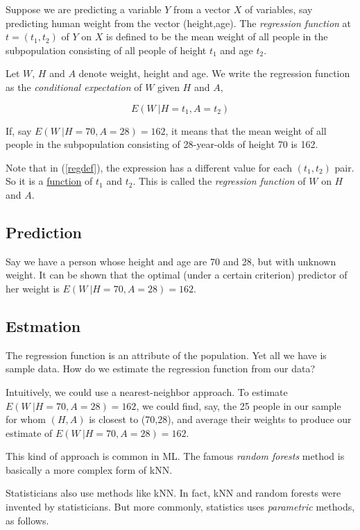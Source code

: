 Suppose we are predicting a variable $Y$ from a vector $X$ of variables,
say predicting human weight from the vector (height,age).  The
\textit{regression function} at $t = (t_1,t_2)$ of $Y$ on $X$ is defined
to be the mean weight of all people in the subpopulation consisting of
all people of height $t_1$ and age $t_2$.

Let $W$, $H$ and $A$ denote weight, height and age.  We write the
regression function as the \textit{conditional expectation} of $W$ given
$H$ and $A$, 

\begin{equation}
\label{regdef}
E(W ~| H=t_1, A=t_2)
\end{equation}

If, say $E(W ~| H=70, A=28) = 162$, it means that the mean weight of all
people in the subpopulation consisting of 28-year-olds of height 70 is
162.

Note that in (\ref{regdef}), the expression has a different value for
each $(t_1,t_2)$ pair.  So it is a \underline{function} of $t_1$ and
$t_2$.  This is called the \textit{regression function} of $W$ on $H$
and $A$.

\subsection{Prediction}

Say we have a person whose height and age are 70 and 28, but with
unknown weight.  It can be shown that the optimal (under a certain
criterion) predictor of her weight is $E(W ~| H=70, A=28) = 162$.

\subsection{Estmation}

The regression function is an attribute of the population.  Yet all we
have is sample data.  How do we estimate the regression function from
our data?

Intuitively, we could use a nearest-neighbor approach.  To estimate
$E(W ~| H=70, A=28) = 162$, we could find, say, the 25 people in our
sample for whom $(H,A)$ is closest to (70,28), and average their weights
to produce our estimate of $E(W ~| H=70, A=28) = 162$.  

This kind of approach is common in ML.  The famous \textit{random
forests} method is basically a more complex form of kNN.

Statisticians also use methods like kNN.  In fact, kNN and random
forests were invented by statisticians.  But more commonly, statistics
uses \textit{parametric} methods, as follows.

